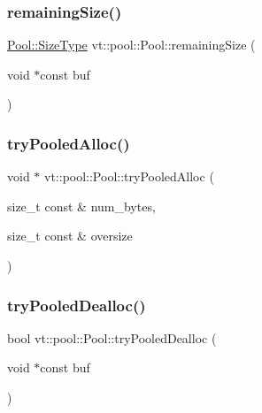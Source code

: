 \subsubsection{\texorpdfstring{remaining\+Size()}{remainingSize()}}
{\footnotesize\ttfamily \hyperlink{structvt_1_1pool_1_1_pool_a4030898e09d0160c24743a7b949c0d46}{Pool\+::\+Size\+Type} vt\+::pool\+::\+Pool\+::remaining\+Size (\begin{DoxyParamCaption}\item[{void $\ast$const}]{buf }\end{DoxyParamCaption})}

\mbox{\label{structvt_1_1pool_1_1_pool_abd5f079910c28493ad3b0d5a9469f00a}} 
\subsubsection{\texorpdfstring{try\+Pooled\+Alloc()}{tryPooledAlloc()}}
{\footnotesize\ttfamily void $\ast$ vt\+::pool\+::\+Pool\+::try\+Pooled\+Alloc (\begin{DoxyParamCaption}\item[{size\+\_\+t const \&}]{num\+\_\+bytes,  }\item[{size\+\_\+t const \&}]{oversize }\end{DoxyParamCaption})\hspace{0.3cm}{\ttfamily [private]}}

\mbox{\label{structvt_1_1pool_1_1_pool_adf32f4660575880101522e5d6b640edd}} 
\subsubsection{\texorpdfstring{try\+Pooled\+Dealloc()}{tryPooledDealloc()}}
{\footnotesize\ttfamily bool vt\+::pool\+::\+Pool\+::try\+Pooled\+Dealloc (\begin{DoxyParamCaption}\item[{void $\ast$const}]{buf }\end{DoxyParamCaption})\hspace{0.3cm}{\ttfamily [private]}}



